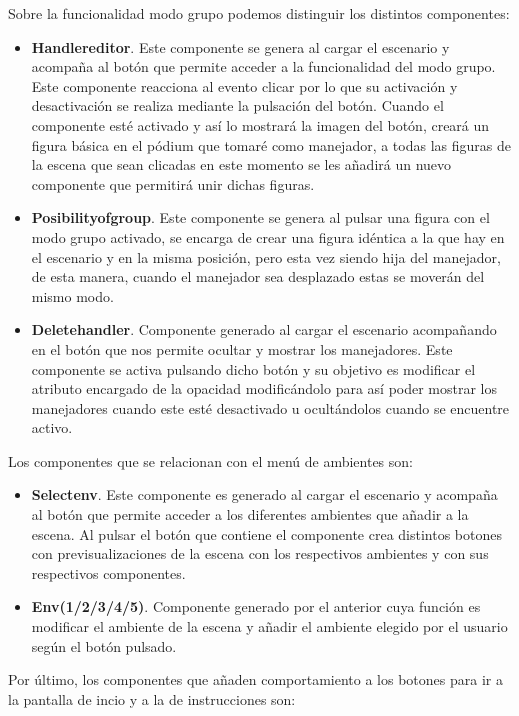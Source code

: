 \documentclass[a4paper, 12pt]{book}
\begin{document}
    
Sobre la funcionalidad modo grupo podemos distinguir los distintos componentes:
\begin{itemize}
    \item \textbf{Handlereditor}. Este componente se genera al cargar el escenario y acompaña al botón que permite acceder a la funcionalidad del modo grupo. Este componente reacciona al evento clicar por lo que su activación y desactivación se realiza mediante la pulsación del botón. Cuando el componente esté activado y así lo mostrará la imagen del botón, creará un figura básica en el pódium que tomaré como manejador, a todas las figuras de la escena que sean clicadas en este momento se les añadirá un nuevo componente que permitirá unir dichas figuras.
    
    \item \textbf{Posibilityofgroup}. Este componente se genera al pulsar una figura con el modo grupo activado, se encarga de crear una figura idéntica a la que hay en el escenario y en la misma posición, pero esta vez siendo hija del manejador, de esta manera, cuando el manejador sea desplazado estas se moverán del mismo modo.
    
    \item \textbf{Deletehandler}. Componente generado al cargar el escenario acompañando en el botón que nos permite ocultar y mostrar los manejadores. Este componente se activa pulsando dicho botón y su objetivo es modificar el atributo encargado de la opacidad modificándolo para así poder mostrar los manejadores cuando este esté desactivado u ocultándolos cuando se encuentre activo.
\end{itemize}

Los componentes que se relacionan con el menú de ambientes son:
\begin{itemize}
    \item \textbf{Selectenv}. Este componente es generado al cargar el escenario y acompaña al botón que permite acceder a los diferentes ambientes que añadir a la escena. Al pulsar el botón que contiene el componente crea distintos botones con previsualizaciones de la escena con los respectivos ambientes y con sus respectivos componentes.
    \item \textbf{Env(1/2/3/4/5)}. Componente generado por el anterior cuya función es modificar el ambiente de la escena y añadir el ambiente elegido por el usuario según el botón pulsado.
    
\end{itemize}

Por último, los componentes que añaden comportamiento a los botones para ir a la pantalla de incio y a la de instrucciones son:
\end{document}
